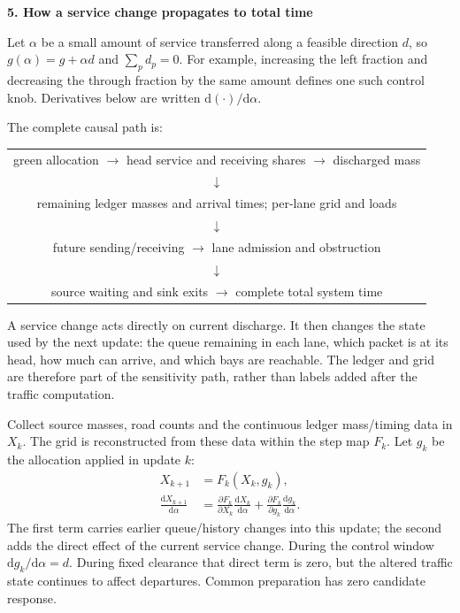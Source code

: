 \documentclass[10pt,a4paper]{article}
\newenvironment{revision}{\begingroup\color{revisionred}}{\par\endgroup}
\newcommand{\head}[1]{\par\vspace{4pt}\noindent\textbf{#1}\par\nobreak\vspace{1pt}}
\begin{document}
\begin{revision}
\head{5. How a service change propagates to total time}
Let $\alpha$ be a small amount of service transferred along a feasible
direction $d$, so $g(\alpha)=g+\alpha d$ and $\sum_p d_p=0$.
For example, increasing the left fraction and decreasing the through
fraction by the same amount defines one such control knob. Derivatives
below are written $\mathrm d(\cdot)/\mathrm d\alpha$.

The complete causal path is:
\begin{center}
\begin{tabular}{c}
green allocation $\longrightarrow$ head service and receiving shares
$\longrightarrow$ discharged mass\\
$\downarrow$\\
remaining ledger masses and arrival times; per-lane grid and loads\\
$\downarrow$\\
future sending/receiving $\longrightarrow$ lane admission and obstruction\\
$\downarrow$\\
source waiting and sink exits $\longrightarrow$ complete total system time
\end{tabular}
\end{center}
A service change acts directly on current discharge. It then changes the
state used by the next update: the queue remaining in each lane, which
packet is at its head, how much can arrive, and which bays are reachable.
The ledger and grid are therefore part of the sensitivity path, rather
than labels added after the traffic computation.

Collect source masses, road counts and the continuous ledger mass/timing
data in $X_k$. The grid is reconstructed from these data within the step
map $F_k$. Let $g_k$ be the allocation applied in update $k$:
\begin{equation}
 \begin{aligned}
 X_{k+1}&=F_k(X_k,g_k),\\
 \frac{\mathrm dX_{k+1}}{\mathrm d\alpha}
 &=\frac{\partial F_k}{\partial X_k}
       \frac{\mathrm dX_k}{\mathrm d\alpha}
  +\frac{\partial F_k}{\partial g_k}
       \frac{\mathrm dg_k}{\mathrm d\alpha}.
 \end{aligned}
 \label{eq:compact-chain}
\end{equation}
The first term carries earlier queue/history changes into this update;
the second adds the direct effect of the current service change.
During the control window $\mathrm dg_k/\mathrm d\alpha=d$.
During fixed clearance that direct term is zero, but the altered traffic
state continues to affect departures. Common preparation has zero
candidate response.


\end{revision}
\end{document}
